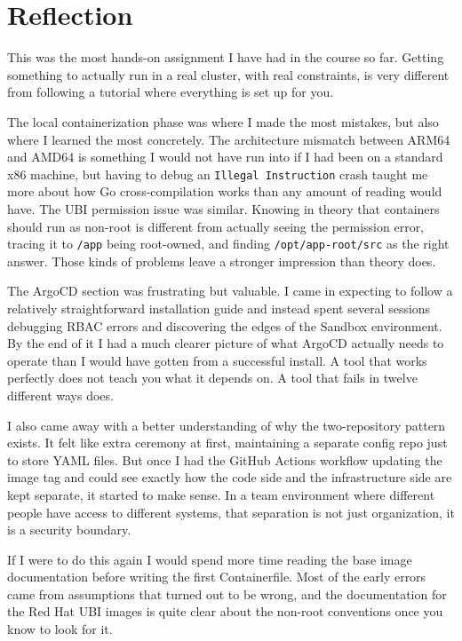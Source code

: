 \section{Reflection}

This was the most hands-on assignment I have had in the course so far. Getting something
to actually run in a real cluster, with real constraints, is very different from following
a tutorial where everything is set up for you.

The local containerization phase was where I made the most mistakes, but also where I
learned the most concretely. The architecture mismatch between ARM64 and AMD64 is
something I would not have run into if I had been on a standard x86 machine, but having
to debug an \texttt{Illegal Instruction} crash taught me more about how Go cross-compilation
works than any amount of reading would have. The UBI permission issue was similar. Knowing
in theory that containers should run as non-root is different from actually seeing the
permission error, tracing it to \texttt{/app} being root-owned, and finding
\texttt{/opt/app-root/src} as the right answer. Those kinds of problems leave a stronger
impression than theory does.

The ArgoCD section was frustrating but valuable. I came in expecting to follow a
relatively straightforward installation guide and instead spent several sessions debugging
RBAC errors and discovering the edges of the Sandbox environment. By the end of it I had
a much clearer picture of what ArgoCD actually needs to operate than I would have gotten
from a successful install. A tool that works perfectly does not teach you what it depends
on. A tool that fails in twelve different ways does.

I also came away with a better understanding of why the two-repository pattern exists.
It felt like extra ceremony at first, maintaining a separate config repo just to store
YAML files. But once I had the GitHub Actions workflow updating the image tag and could
see exactly how the code side and the infrastructure side are kept separate, it started
to make sense. In a team environment where different people have access to different
systems, that separation is not just organization, it is a security boundary.

If I were to do this again I would spend more time reading the base image documentation
before writing the first Containerfile. Most of the early errors came from assumptions
that turned out to be wrong, and the documentation for the Red Hat UBI images is quite
clear about the non-root conventions once you know to look for it.
